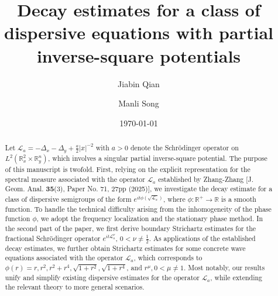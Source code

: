 \documentclass[a4paper,11pt, reqno]{amsart}
\title[Decay estimates for a class of dispersive equations]{Decay estimates for a class of dispersive equations with partial inverse-square potentials
}
\author{Jiabin Qian}
\author{Manli Song}
\date{\today}
\numberwithin{equation}{section}
\theoremstyle{plain}
\theoremstyle{definition}
\theoremstyle{remark}
\begin{document}
	
	\maketitle
	
	
	\allowdisplaybreaks
	
	
	
\begin{abstract}
Let $\mathcal{L}_a=-\Delta_x-\Delta_y+\frac{a}{2}|x|^{-2}$ with $a>0$ denote the Schr\"odinger operator on $L^2(\mathbb{R}^2_x\times \mathbb{R}^n_y)$, which involves a singular partial inverse-square potential. The purpose of this manuscript is twofold. 	First, relying on the explicit representation for the spectral measure associated with
the operator $\mathcal{L}_a$ established by Zhang-Zhang [J. Geom. Anal. \textbf{35}(3), Paper No. 71, 27pp (2025)], we investigate the decay estimate for a class of dispersive semigroups of the form $e^{it\phi(\sqrt{\mathcal{L}_a})}$, where $\phi: \mathbb{R}^+ \to \mathbb{R}$ is a smooth function. To handle the technical difficulty arising from the inhomogeneity of the phase function $\phi$, we adopt the frequency localization and the stationary phase method. In the second part of the paper, we first derive boundary Strichartz estimates for the fractional Schr\"odinger operator $e^{it\mathcal{L}_a^\nu}$, $0<\nu\neq\frac{1}{2}$. As applications of the established decay estimates, we further obtain Strichartz estimates for some concrete wave equations associated with the operator $\mathcal{L}_a$, which corresponds to  $\phi(r)=r, r^2, r^2+r^4, \sqrt{1+r^2}, \sqrt{1+r^4}$, and $r^\mu,0<\mu\neq 1$. Most notably, our results unify and simplify existing dispersive estimates for the operator $\mathcal{L}_a$, while extending the relevant theory to more general scenarios.
\end{abstract}
	\tableofcontents 	
 
 



 
\end{document}
